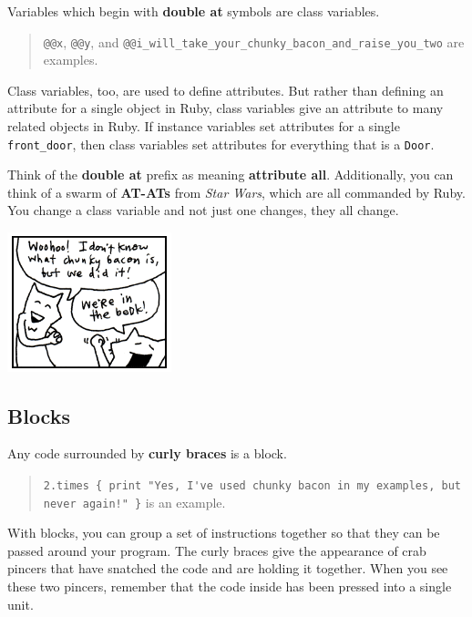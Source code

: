 \documentclass[10pt,twoside]{report}
\begin{document}
Variables which begin with {\bf double at} symbols are class
variables.

\begin{quote}
\lstinline[breaklines=true]|@@x|, \lstinline[breaklines=true]|@@y|,
and
\lstinline[breaklines=true]|@@i_will_take_your_chunky_bacon_and_raise_you_two|
are examples.\end{quote}


Class variables, too, are used to define attributes.  But rather than
defining an attribute for a single object in Ruby, class variables
give an attribute to many related objects in Ruby.  If instance
variables set attributes for a single
\lstinline[breaklines=true]|front_door|, then class variables set
attributes for everything that is a \lstinline[breaklines=true]|Door|.

Think of the {\bf double at} prefix as meaning {\bf attribute all}.
Additionally, you can think of a swarm of {\bf AT-ATs} from {\em Star
  Wars}, which are all commanded by Ruby.  You change a class variable
and not just one changes, they all change.

	\includegraphics[width=0.3575\textwidth]{cache/13.png}




\subsection{Blocks}



Any code surrounded by {\bf curly braces} is a block.

\begin{quote}
\lstinline[breaklines=true]|2.times { print "Yes, I've used chunky bacon in my examples, but never again!" }| is an example.\end{quote}


With blocks, you can group a set of instructions together so that they
can be passed around your program.  The curly braces give the
appearance of crab pincers that have snatched the code and are holding
it together.  When you see these two pincers, remember that the code
inside has been pressed into a single unit.
\end{document}
